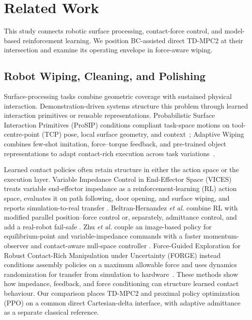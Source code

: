 \section{Related Work}
\label{sec:related_work}

This study connects robotic surface processing, contact-force control, and
model-based reinforcement learning. We position BC-assisted direct TD-MPC2 at their
intersection and examine its operating envelope in force-aware wiping.

\subsection{Robot Wiping, Cleaning, and Polishing}

Surface-processing tasks combine geometric coverage with sustained physical
interaction. Demonstration-driven systems structure this problem through
learned interaction primitives or reusable representations. Probabilistic
Surface Interaction Primitives (ProSIP) conditions compliant task-space
motions on tool-centre-point (TCP) pose, local surface geometry, and
context~\cite{unger2024prosip}; Adaptive Wiping combines few-shot imitation,
force--torque feedback, and pre-trained object representations to adapt
contact-rich execution across task variations~\cite{tsuji2025adaptivewiping}.

Learned contact policies often retain structure in either the action space or
the execution layer. Variable Impedance Control in End-Effector Space (VICES)
treats variable end-effector impedance as a reinforcement-learning (RL)
action space, evaluates it on path following, door opening, and surface wiping,
and reports simulation-to-real transfer
\cite{martinmartin2019vices}. Beltran-Hernandez \emph{et al.} combine RL with
modified parallel position--force control or, separately, admittance control,
and add a real-robot fail-safe
\cite{beltranhernandez2020force}. Zhu \emph{et al.} couple an image-based
policy for equilibrium-point and variable-impedance commands with a faster
momentum-observer and contact-aware null-space controller
\cite{zhu2022contactsafe}. Force-Guided Exploration for Robust Contact-Rich
Manipulation under Uncertainty (FORGE) instead conditions assembly policies on
a maximum allowable force and uses dynamics randomization for transfer from
simulation to hardware~\cite{noseworthy2025forge}. These methods show how
impedance, feedback, and force conditioning can structure learned contact
behaviour. Our comparison places TD-MPC2 and proximal policy optimization
(PPO) on a common direct Cartesian-delta interface, with adaptive admittance as a separate classical
reference.

